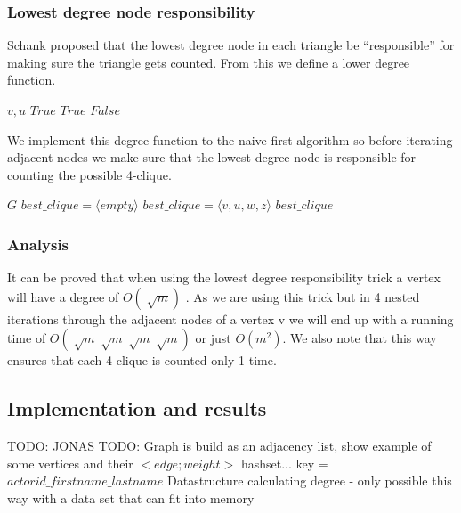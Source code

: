 \documentclass{article}
\begin{document}
\subsubsection{Lowest degree node responsibility}
Schank \cite{AlgorithmicAspects} proposed that the lowest degree node in each triangle be “responsible” for making sure the triangle gets counted. From this we define a lower degree function.

\begin{algorithm}
\caption{$lower\_degree$}
\begin{algorithmic}
\REQUIRE $v,u$
\RETURN $True$
\RETURN $True$
\ELSE
\RETURN $False$
\ENDIF
\end{algorithmic}
\end{algorithm}

We implement this degree function to the naive first algorithm so before iterating adjacent nodes we make sure that the lowest degree node is responsible for counting the possible 4-clique.

\begin{algorithm}
\caption{$strong\_4clique\_finder++$}
\begin{algorithmic}
\REQUIRE $G$
\STATE $best\_clique = \langle empty\rangle $
\STATE $best\_clique = \langle v,u,w,z\rangle $
\ENDIF
\ENDIF
\ENDFOR
\ENDIF
\ENDFOR
\ENDIF
\ENDFOR
\ENDFOR
\RETURN $best\_clique$
\end{algorithmic}
\end{algorithm}

\subsubsection{Analysis}
It can be proved that when using the lowest degree responsibility trick a vertex will have a degree of $O(\sqrt[]{m})$ \cite{AlgorithmicAspects}. As we are using this trick but in 4 nested iterations through the adjacent nodes of a vertex v we will end up with a running time of $O(\sqrt[]{m}\sqrt[]{m}\sqrt[]{m}\sqrt[]{m})$ or just $O(m^{2})$. We also note that this way ensures that each 4-clique is counted only 1 time.


\subsection{Implementation and results}
TODO: JONAS
TODO: Graph is build as an adjacency list, show example of some vertices and their $<edge;weight>$ hashset...
key = $actorid\_firstname\_lastname$
Datastructure calculating degree - only possible this way with a data set that can fit into memory
\end{document}

